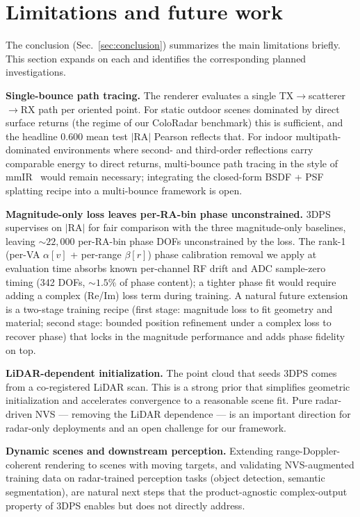 \section{Limitations and future work}
\label{app:limitations}

The conclusion (Sec.~\ref{sec:conclusion}) summarizes the main limitations briefly. This section expands on each and identifies the corresponding planned investigations.

\textbf{Single-bounce path tracing.} The renderer evaluates a single TX$\to$scatterer$\to$RX path per oriented point. For static outdoor scenes dominated by direct surface returns (the regime of our ColoRadar benchmark) this is sufficient, and the headline 0.600 mean test $|\mathrm{RA}|$ Pearson reflects that. For indoor multipath-dominated environments where second- and third-order reflections carry comparable energy to direct returns, multi-bounce path tracing in the style of mmIR~\cite{mmIR2026} would remain necessary; integrating the closed-form BSDF + PSF splatting recipe into a multi-bounce framework is open.

\textbf{Magnitude-only loss leaves per-RA-bin phase unconstrained.} 3DPS supervises on $|\mathrm{RA}|$ for fair comparison with the three magnitude-only baselines, leaving $\sim\!22{,}000$ per-RA-bin phase DOFs unconstrained by the loss. The rank-1 (per-VA $\alpha[v]$ + per-range $\beta[r]$) phase calibration removal we apply at evaluation time absorbs known per-channel RF drift and ADC sample-zero timing (342 DOFs, ${\sim}1.5\%$ of phase content); a tighter phase fit would require adding a complex (Re/Im) loss term during training. A natural future extension is a two-stage training recipe (first stage: magnitude loss to fit geometry and material; second stage: bounded position refinement under a complex loss to recover phase) that locks in the magnitude performance and adds phase fidelity on top.

\textbf{LiDAR-dependent initialization.} The point cloud that seeds 3DPS comes from a co-registered LiDAR scan. This is a strong prior that simplifies geometric initialization and accelerates convergence to a reasonable scene fit. Pure radar-driven NVS --- removing the LiDAR dependence --- is an important direction for radar-only deployments and an open challenge for our framework.

\textbf{Dynamic scenes and downstream perception.} Extending range-Doppler-coherent rendering to scenes with moving targets, and validating NVS-augmented training data on radar-trained perception tasks (object detection, semantic segmentation), are natural next steps that the product-agnostic complex-output property of 3DPS enables but does not directly address.


